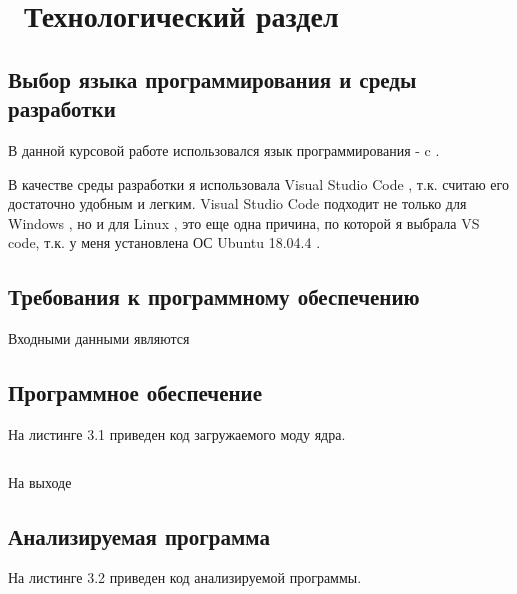 \chapter{ Технологический раздел}
\label{cha:design}

\section{Выбор языка программирования и среды разработки}

В данной курсовой работе использовался язык программирования - c \cite{bib1}.

В качестве среды разработки я использовала Visual Studio Code \cite{bib2}, т.к. считаю его достаточно удобным и легким.
Visual Studio Code подходит не только для  Windows \cite{bib3}, но и для Linux \cite{bib4}, это еще одна причина, по которой я выбрала VS code,
т.к. у меня установлена ОС Ubuntu 18.04.4 \cite{bib5}.

\section{Требования к программному обеспечению}

Входными данными являются

\section{Программное обеспечение}

На листинге 3.1 приведен код загружаемого моду ядра. 

\begin{lstlisting}[language=c, label=some-code, caption=Загружаемый модуль ядра]

\end{lstlisting}

На выходе

\section{Анализируемая программа}

На листинге 3.2 приведен код анализируемой программы. 


